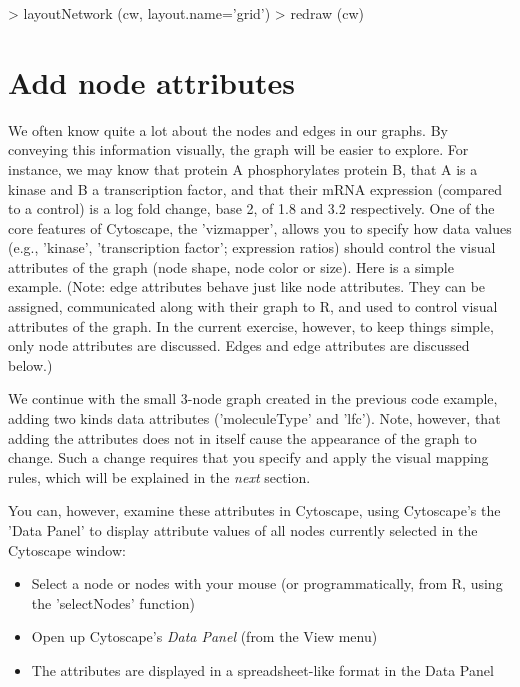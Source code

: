 \documentclass[12pt]{article}
\begin{document}
\begin{Schunk}
\begin{Sinput}
>   layoutNetwork (cw, layout.name='grid')
>   redraw (cw)
\end{Sinput}
\end{Schunk}


\section{Add node attributes}

We often know quite a lot about the nodes and edges in our graphs.   By conveying this information visually, the graph will be
easier to explore.  For instance, we may know that protein A phosphorylates protein B, that A is a kinase and B a
transcription factor, and that their mRNA expression (compared to a control) is a log fold change, base 2, of 1.8 and
3.2 respectively.  One of the core features of Cytoscape, the 'vizmapper', allows you to specify how data values (e.g.,
'kinase', 'transcription factor'; expression ratios) should control the visual attributes of the graph (node shape, node color or size).
Here is a simple example.  (Note: edge attributes behave just like node attributes.  They can be assigned, communicated along with their graph to R, and used to control visual attributes of the graph.  In the current exercise, however,  to keep things simple, only
node attributes are discussed.  Edges and edge attributes are discussed below.)

We continue with the small 3-node graph created in the previous code example, adding two kinds data attributes ('moleculeType' and 'lfc').
Note, however, that adding the attributes does not in itself cause the appearance of the graph to change.  Such a change requires
that you specify and apply the visual mapping rules, which will be explained in the \emph{next} section.

You can, however, examine these attributes in Cytoscape, using Cytoscape's the 'Data Panel' to display attribute values of all nodes currently selected in the Cytoscape window:

\begin{itemize}
\item Select a node or nodes with your mouse (or programmatically, from R, using the 'selectNodes' function)
\item Open up Cytoscape's \emph{Data Panel} (from the View menu)
\item The attributes are displayed in a spreadsheet-like format in the Data Panel
\end{itemize}
\end{document}
